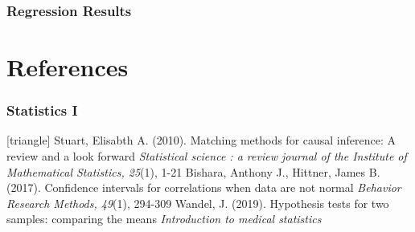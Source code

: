 \documentclass[xcolor=table]{beamer}
\begin{document}
\begin{frame}
	\frametitle{Regression Results}
	\begin{table}[h!]\caption{Results for the mixed-effect linear models on filtered data}
	\end{table}
	
	\begin{table}[h!]\caption{Results of the ANCOVA}
	\end{table}
	\vspace{0.2cm}
\end{frame}


\appendix

\section{References}
\begin{frame}
	\frametitle{Statistics I}
	\footnotesize{
		\begin{thebibliography}{99}
			[triangle]
			 Stuart, Elisabth A. (2010).
			\newblock Matching methods for causal inference: A review and a look forward
			\newblock \textit{Statistical science : a review journal of the Institute of Mathematical Statistics, 25}(1), 1-21
			\vspace{1mm}
			 Bishara, Anthony J., Hittner, James B. (2017).
			\newblock Confidence intervals for correlations when data are not normal
			\newblock \textit{Behavior Research Methods, 49}(1), 294-309
			\vspace{1mm}
			 Wandel, J. (2019).
			\newblock Hypothesis tests for two samples: comparing the means
			\newblock \textit{Introduction to medical statistics}
		\end{thebibliography}
	}
\end{frame}
\end{document}
